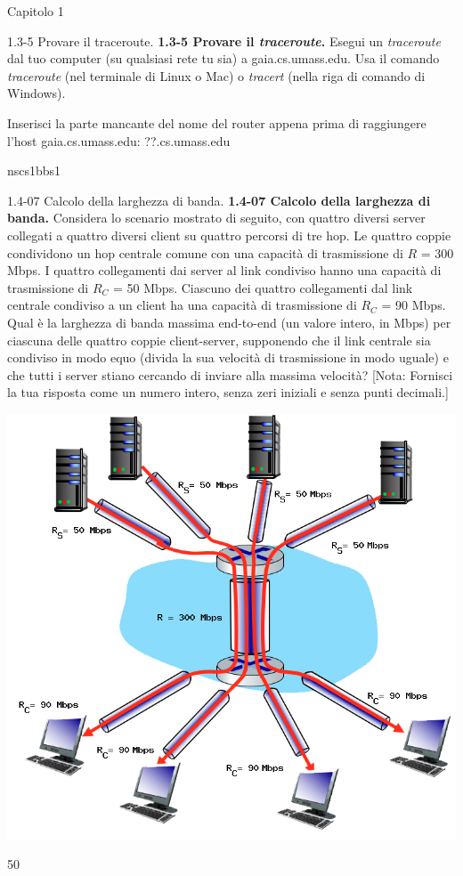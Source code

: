 \documentclass[a4paper]{article}
\begin{document}
\begin{quiz}{Capitolo 1}
\begin{shortanswer}[points=1]{1.3-5 Provare il traceroute.}
\textbf{1.3-5 Provare il \textit{traceroute}.} 
Esegui un \textit{traceroute} dal tuo computer (su qualsiasi rete tu sia) a gaia.cs.umass.edu. Usa il comando \textit{traceroute} (nel terminale di Linux o Mac) o \textit{tracert} (nella riga di comando di Windows). 

Inserisci la parte mancante del nome del router appena prima di raggiungere l'host gaia.cs.umass.edu: ??.cs.umass.edu
\item* nscs1bbs1
\end{shortanswer}

\begin{shortanswer}[points=1]{1.4-07 Calcolo della larghezza di banda.}
\textbf{1.4-07 Calcolo della larghezza di banda.} 
Considera lo scenario mostrato di seguito, con quattro diversi server collegati a quattro diversi client su quattro percorsi di tre hop. Le quattro coppie condividono un hop centrale comune con una capacità di trasmissione di $R$ = 300 Mbps. I quattro collegamenti dai server al link condiviso hanno una capacità di trasmissione di $R_C$ = 50 Mbps. Ciascuno dei quattro collegamenti dal link centrale condiviso a un client ha una capacità di trasmissione di $R_C$ = 90 Mbps. Qual è la larghezza di banda massima end-to-end (un valore intero, in Mbps) per ciascuna delle quattro coppie client-server, supponendo che il link centrale sia condiviso in modo equo (divida la sua velocità di trasmissione in modo uguale) e che tutti i server stiano cercando di inviare alla massima velocità? 
[Nota: Fornisci la tua risposta come un numero intero, senza zeri iniziali e senza punti decimali.]
\begin{center}
\includegraphics[width=\linewidth]{figs/1.4.7.png}
\end{center}
\item* 50
\end{shortanswer}


\end{quiz}
\end{document}
